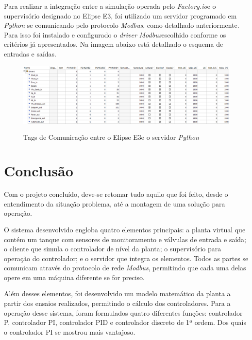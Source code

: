 \documentclass[
	article,			%
	11pt,				%
	oneside,			%
	a4paper,			%
	section=TITLE,		%
	english,			%
	brazil,				%
	sumario=tradicional
	]{abntex2}
\newcommand{\factorio}{\textit{Factory.io}}%
\newcommand{\EE}{Elipse E3}%
\newcommand{\Py}{\textit{Python}}%
\newcommand{\Mb}{\textit{Modbus}}%
\begin{document}
Para realizar a integração entre a simulação operada pelo \factorio e o supervisório designado no \EE, foi utilizado um servidor programado em \Py{} se comunicando pelo protocolo \Mb, como detalhado anteriormente. Para isso foi instalado e configurado o \textit{driver} \Mb escolhido conforme os critérios já apresentados. Na imagem abaixo está detalhado o esquema de entradas e saídas.

\begin{landscape}
\begin{figure}[H]
    \centering
\caption{Tags de Comunicação entre o \EE e o servidor \Py{}}
\includegraphics[width=23cm]{img/tags_driver.png}
    \label{fig:tags-comm-2}
\end{figure}

\end{landscape}

\newpage

\section{Conclusão}

Com o projeto concluído, deve-se retomar tudo aquilo que foi feito, desde o entendimento da situação problema, até a montagem de uma solução para operação.
 
O sistema desenvolvido engloba quatro elementos principais: a planta virtual que contém um tanque com sensores de monitoramento e válvulas de entrada e saída; o cliente que simula o controlador de nível da planta; o supervisório para operação do controlador; e o servidor que integra os elementos. Todos as partes se comunicam através do protocolo de rede \Mb, permitindo que cada uma delas opere em uma máquina diferente se for preciso.

Além desses elementos, foi desenvolvido um modelo matemático da planta a partir dos ensaios realizados, permitindo o cálculo dos controladores. Para a operação desse sistema, foram formulados quatro diferentes funções: controlador P, controlador PI, controlador PID e controlador discreto de 1ª ordem. Dos quais o controlador PI se mostrou mais vantajoso.
\end{document}
